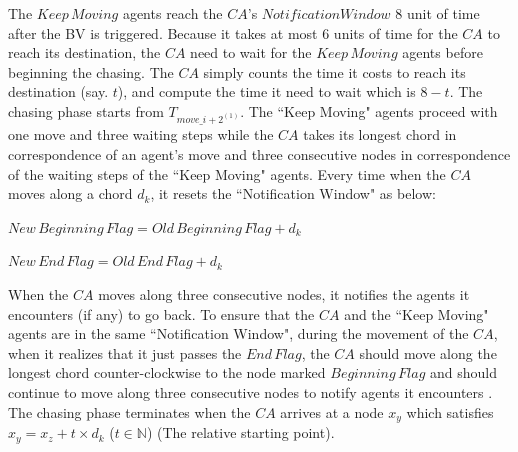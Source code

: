 The $Keep\,Moving$ agents reach the $CA$'s $Notification Window$ 8 unit of time after the BV is triggered. Because it takes at most 6 units of time for the $CA$ to reach its destination, the $CA$ need to wait  for the $Keep\,Moving$ agents before beginning the chasing. The $CA$ simply counts the time it costs to reach its destination (say. $t$), and compute the time it need to wait which is $8-t$.
The chasing phase starts from $T_{move\_{{i+2}^{(1)}}}$. The ``Keep Moving" agents proceed with one move and three waiting steps while the $CA$ takes its longest chord in correspondence of an agent's move and three consecutive nodes in correspondence of the waiting steps of the ``Keep Moving" agents. Every time when the $CA$ moves along  a chord $d_k$, it resets the ``Notification Window" as below: 

$New\,Beginning\,Flag=Old\,Beginning\,Flag+d_k$

$New\,End\,Flag=Old\,End\,Flag+d_k$

When the $CA$ moves along three consecutive nodes, it notifies the agents it encounters (if any) to go back. To ensure that the $CA$ and the ``Keep Moving" agents are in the same ``Notification Window", during the movement of the $CA$,   when it realizes that it just passes the $End\,Flag$, the $CA$ should move along the longest chord counter-clockwise to the node marked   $Beginning\,Flag$ and should continue to move   along three consecutive nodes to notify agents it encounters . The chasing phase terminates when the $CA$ arrives at a  node $x_y$ which satisfies $x_y=x_z+t\times{d_k}$ ($t\in \mathbb{N}$) (The relative starting point). 

